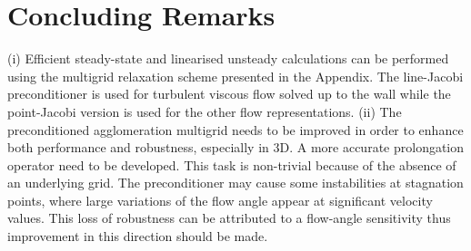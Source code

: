%
%
%
\section{Concluding Remarks}
%
 (i) Efficient steady-state and linearised unsteady calculations can
 be performed using the multigrid relaxation scheme presented in the Appendix.
 The line-Jacobi preconditioner is used for turbulent viscous flow solved up to
 the wall while the point-Jacobi version is used for the other flow
 representations.
%
 (ii) The preconditioned agglomeration multigrid needs to be improved in order to
 enhance both performance and robustness, especially in 3D.
 A more accurate prolongation operator
 need to be developed. This task is non-trivial because of the absence
 of an underlying grid. The preconditioner may cause some instabilities
 at stagnation points, where large variations of the flow angle appear
 at significant velocity values. This loss of robustness can be attributed to
 a flow-angle sensitivity thus improvement in this direction should be made.
